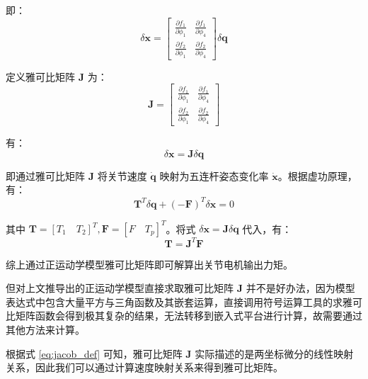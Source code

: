 \documentclass[
  oneside,
  degree=bachelor,
  fullwidthstop=false,
  fontset=fandol,
  times=false,
  minted=true,
  biblatex=true,
]{tongjithesis}
\begin{document}
即：
\begin{equation}
    \delta \boldsymbol{x} = 
    \begin{bmatrix}
        \frac{\partial f_1}{\partial \phi_1} & \frac{\partial f_1}{\partial \phi_4} \\
        \frac{\partial f_2}{\partial \phi_1} & \frac{\partial f_2}{\partial \phi_4}
    \end{bmatrix} \delta \boldsymbol{q}
\end{equation}

定义雅可比矩阵 $\boldsymbol{J}$ 为：
\begin{equation}
    \boldsymbol{J} = 
    \begin{bmatrix}
        \frac{\partial f_1}{\partial \phi_1} & \frac{\partial f_1}{\partial \phi_4} \\
        \frac{\partial f_2}{\partial \phi_1} & \frac{\partial f_2}{\partial \phi_4}
    \end{bmatrix}
    \label{eq:jacob_def}
\end{equation}

有：
\begin{equation}
    \delta \boldsymbol{x} = \boldsymbol{J} \delta \boldsymbol{q}
\end{equation}

即通过雅可比矩阵 $\boldsymbol{J}$ 将关节速度 $\dot{\boldsymbol{q}}$ 映射为五连杆姿态变化率 $\dot{\boldsymbol{x}}$。根据虚功原理，有：
\begin{equation}
    \boldsymbol{T}^T \delta \boldsymbol{q} + (-\boldsymbol{F})^T \delta \boldsymbol{x} = 0
\end{equation}

其中 $\boldsymbol{T} = [T_1 \quad T_2]^T, \boldsymbol{F} = [F \quad T_p]^T$。将式 $\delta \boldsymbol{x} = \boldsymbol{J} \delta \boldsymbol{q}$ 代入，有：
\begin{equation}
    \boldsymbol{T} = \boldsymbol{J}^T \boldsymbol{F}
\end{equation}

综上通过正运动学模型雅可比矩阵即可解算出关节电机输出力矩。

但对上文推导出的正运动学模型直接求取雅可比矩阵 $\boldsymbol{J}$ 并不是好办法，因为模型表达式中包含大量平方与三角函数及其嵌套运算，直接调用符号运算工具的求雅可比矩阵函数会得到极其复杂的结果，无法转移到嵌入式平台进行计算，故需要通过其他方法来计算。

根据式 \eqref{eq:jacob_def} 可知，雅可比矩阵 $\boldsymbol{J}$ 实际描述的是两坐标微分的线性映射关系，因此我们可以通过计算速度映射关系来得到雅可比矩阵。
\end{document}
